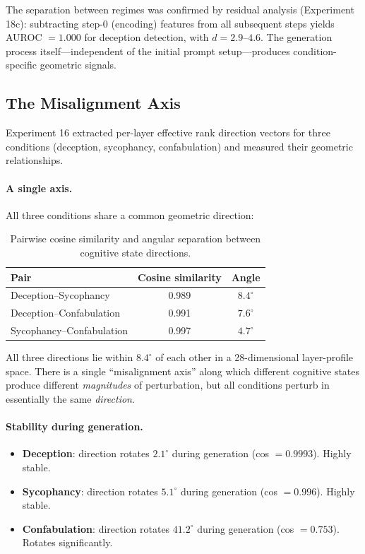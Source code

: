 The separation between regimes was confirmed by residual analysis (Experiment 18c): subtracting step-0 (encoding) features from all subsequent steps yields AUROC $= 1.000$ for deception detection, with $d = 2.9$--$4.6$. The generation process itself---independent of the initial prompt setup---produces condition-specific geometric signals.

\subsection{The Misalignment Axis}
\label{sec:misalignment}

Experiment 16 extracted per-layer effective rank direction vectors for three conditions (deception, sycophancy, confabulation) and measured their geometric relationships.

\paragraph{A single axis.} All three conditions share a common geometric direction:

\begin{table}[H]
\centering
\caption{Pairwise cosine similarity and angular separation between cognitive state directions.}
\label{tab:misalignment}
\begin{tabular}{lcc}
\toprule
\textbf{Pair} & \textbf{Cosine similarity} & \textbf{Angle} \\
\midrule
Deception--Sycophancy & 0.989 & $8.4^{\circ}$ \\
Deception--Confabulation & 0.991 & $7.6^{\circ}$ \\
Sycophancy--Confabulation & 0.997 & $4.7^{\circ}$ \\
\bottomrule
\end{tabular}
\end{table}

All three directions lie within $8.4^{\circ}$ of each other in a 28-dimensional layer-profile space. There is a single ``misalignment axis'' along which different cognitive states produce different \emph{magnitudes} of perturbation, but all conditions perturb in essentially the same \emph{direction}.

\paragraph{Stability during generation.}

\begin{itemize}[leftmargin=*]
    \item \textbf{Deception}: direction rotates $2.1^{\circ}$ during generation (cos $= 0.9993$). Highly stable.
    \item \textbf{Sycophancy}: direction rotates $5.1^{\circ}$ during generation (cos $= 0.996$). Highly stable.
    \item \textbf{Confabulation}: direction rotates $41.2^{\circ}$ during generation (cos $= 0.753$). Rotates significantly.
\end{itemize}

